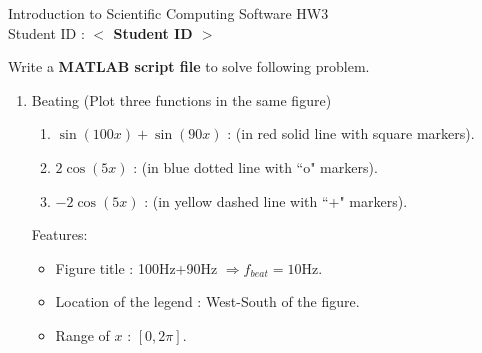 \documentclass[12pt,a4paper]{article}
\newcommand{\placeholder}[1]{\textbf{$<$ #1 $>$}}
\newcommand{\idnumber}{\placeholder{Student ID}}
\begin{document}
\begin{flushleft}Introduction to Scientific Computing Software HW3
\\Student ID : \idnumber{}\end{flushleft}

Write a \textbf{MATLAB script file} to solve following problem.
\begin{enumerate}
\item Beating (Plot three functions in the same figure)
\begin{enumerate} 
\item $\sin(100x)+\sin(90x)$ : (in red solid line with square markers).

\item $2\cos(5x)$ : (in blue dotted line with ``o" markers).
\item $-2\cos(5x)$ : (in yellow dashed line with ``+" markers).
\end{enumerate}
Features:
\begin{itemize}
\item Figure title : 100Hz+90Hz $\Rightarrow f_{beat}=10$Hz.
\item Location of the legend : West-South of the figure.
\item Range of $x $ : $[0,2\pi]$.
\end{itemize}
\end{enumerate}
\end{document}
